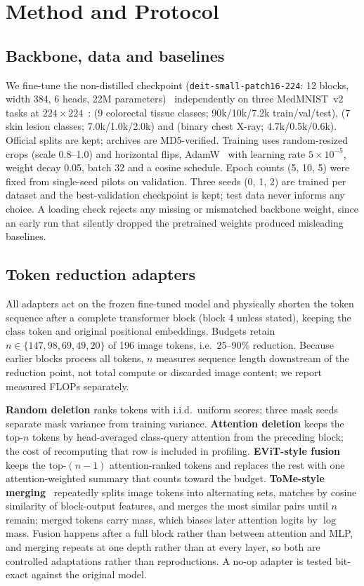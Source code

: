 \section{Method and Protocol}
\label{sec:method}

\subsection{Backbone, data and baselines}
We fine-tune the non-distilled \deit checkpoint (\texttt{deit-small-patch16-224}: 12 blocks, width 384, 6 heads, 22M parameters)~\cite{touvron2021deit} independently on three MedMNIST~v2 tasks at $224\times224$~\cite{yang2023medmnist}: \pathmnist (9 colorectal tissue classes; 90k/10k/7.2k train/val/test), \dermamnist (7 skin lesion classes; 7.0k/1.0k/2.0k) and \pneumnist (binary chest X-ray; 4.7k/0.5k/0.6k). Official splits are kept; archives are MD5-verified. Training uses random-resized crops (scale 0.8--1.0) and horizontal flips, AdamW~\cite{loshchilov2019adamw} with learning rate $5\times10^{-5}$, weight decay 0.05, batch 32 and a cosine schedule. Epoch counts (5, 10, 5) were fixed from single-seed pilots on validation. Three seeds (0, 1, 2) are trained per dataset and the best-validation checkpoint is kept; test data never informs any choice. A loading check rejects any missing or mismatched backbone weight, since an early run that silently dropped the pretrained weights produced misleading baselines.

\subsection{Token reduction adapters}
All adapters act on the frozen fine-tuned model and physically shorten the token sequence after a complete transformer block (block 4 unless stated), keeping the class token and original positional embeddings. Budgets retain $n\in\{147, 98, 69, 49, 20\}$ of 196 image tokens, i.e.\ 25--90\% reduction. Because earlier blocks process all tokens, $n$ measures sequence length downstream of the reduction point, not total compute or discarded image content; we report measured FLOPs separately.

\textbf{Random deletion} ranks tokens with i.i.d.\ uniform scores; three mask seeds separate mask variance from training variance. \textbf{Attention deletion} keeps the top-$n$ tokens by head-averaged class-query attention from the preceding block; the cost of recomputing that row is included in profiling. \textbf{EViT-style fusion}~\cite{liang2022evit} keeps the top-$(n{-}1)$ attention-ranked tokens and replaces the rest with one attention-weighted summary that counts toward the budget. \textbf{ToMe-style merging}~\cite{bolya2023tome} repeatedly splits image tokens into alternating sets, matches by cosine similarity of block-output features, and merges the most similar pairs until $n$ remain; merged tokens carry mass, which biases later attention logits by $\log$ mass. Fusion happens after a full block rather than between attention and MLP, and merging repeats at one depth rather than at every layer, so both are controlled adaptations rather than reproductions. A no-op adapter is tested bit-exact against the original model.

